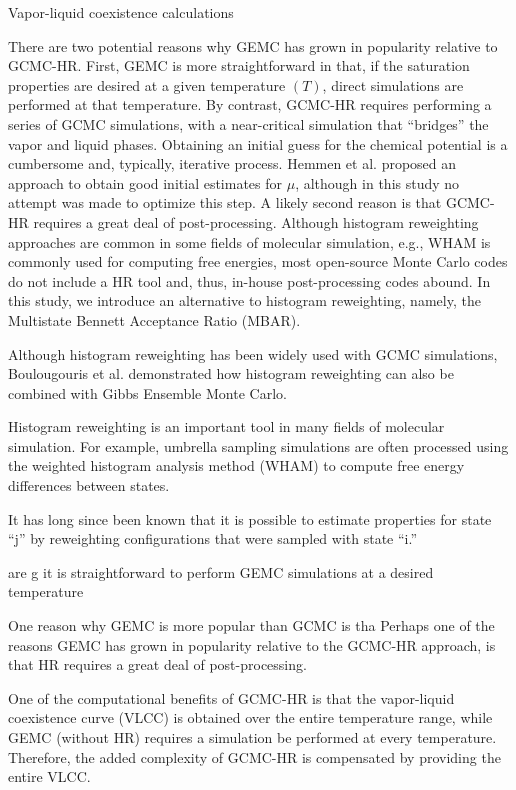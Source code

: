 \documentclass[11pt,a4paper]{article}
\begin{document}
Vapor-liquid coexistence calculations 

There are two potential reasons why GEMC has grown in popularity relative to GCMC-HR. First, GEMC is more straightforward in that, if the saturation properties are desired at a given temperature $(T)$, direct simulations are performed at that temperature. By contrast, GCMC-HR requires performing a series of GCMC simulations, with a near-critical simulation that ``bridges'' the vapor and liquid phases. Obtaining an initial guess for the chemical potential is a cumbersome and, typically, iterative process. Hemmen et al. proposed an approach to obtain good initial estimates for $\mu$, although in this study no attempt was made to optimize this step. A likely second reason is that GCMC-HR requires a great deal of post-processing. Although histogram reweighting approaches are common in some fields of molecular simulation, e.g., WHAM is commonly used for computing free energies, most open-source Monte Carlo codes do not include a HR tool and, thus, in-house post-processing codes abound. In this study, we introduce an alternative to histogram reweighting, namely, the Multistate Bennett Acceptance Ratio (MBAR). 

Although histogram reweighting has been widely used with GCMC simulations, Boulougouris et al. demonstrated how histogram reweighting can also be combined with Gibbs Ensemble Monte Carlo. 

Histogram reweighting is an important tool in many fields of molecular simulation. For example, umbrella sampling simulations are often processed using the weighted histogram analysis method (WHAM) to compute free energy differences between states. 

It has long since been known that it is possible to estimate properties for state ``j'' by reweighting configurations that were sampled with state ``i.'' 

 are g  it is straightforward to perform GEMC simulations at a desired temperature

One reason why GEMC is more popular than GCMC is tha
Perhaps one of the reasons GEMC has grown in popularity relative to the GCMC-HR approach, is that HR requires a great deal of post-processing. 

One of the computational benefits of GCMC-HR is that the vapor-liquid coexistence curve (VLCC) is obtained over the entire temperature range, while GEMC (without HR) requires a simulation be performed at every temperature. Therefore, the added complexity of GCMC-HR is compensated by providing the entire VLCC.
\end{document}
